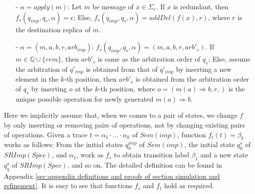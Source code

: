 {\begin{itemize}
\setlength{\itemsep}{0.5pt}
\item[-] $\alpha = apply(m)$: Let $m$ be message of $x \in \Sigma_e$. If $x$ is redundant, then $f_s(q_{\mathit{imp}},q_s,\alpha) = \epsilon$; Else, $f_s(q_{\mathit{imp}},q_s,\alpha) = addDel(f(x),r)$, where $r$ is the destination replica of $m$.

\item[-] $\alpha = (m,a,b,r,\mathit{arb}_{\mathit{imp}})$: $f_s(q_{\mathit{imp}},q_s,\alpha) = (m,a,b,r,\mathit{arb}'_s)$. If $m \in \mathbb{Q} \cup \{ \mathit{rem} \}$, then $\mathit{arb}'_s$ is same as the arbitration order of $q_s$; Else, assume the arbitration of $q'_{\mathit{imp}}$ is obtained from that of $q'_{\mathit{imp}}$ by inserting a new element in the $k$-th position, then $\mathit{arb}'_s$ is obtained from the arbitration order of $q_s$ by inserting $o$ at the $k$-th position, where $o=(m(a)\Rightarrow b,r,)$ is the unique possible operation for newly generated $m(a)\Rightarrow b$.
\end{itemize}

Here we implicitly assume that, when we comes to a pair of states, we change $f$ by only inserting or removing pairs of operations, not by changing existing pairs of operations. Given a trace $t = \alpha_1 \cdot \ldots \cdot \alpha_k$ of $\mathit{Sem}(\mathit{imp})$, function $f_t(t) = \beta_k$ works as follows: From the initial states $q_0^{\mathit{imp}}$ of $\mathit{Sem}(\mathit{imp})$, the initial state $q_0^{s}$ of $\mathit{SRImp}(\mathit{Spec})$, and $\alpha_1$, work as $f_s$ to obtain transition label $\beta_1$ and a new state $q_q^{s}$ of $\mathit{SRImp}(\mathit{Spec})$, and so on. The detailed definition can be found in Appendix \ref{sec:appendix definitions and proofs of section simulation and refinement}. It is easy to see that functions $f_s$ and $f_t$ hold as required.
}


























